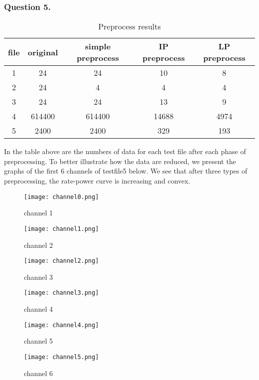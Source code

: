 \documentclass[11pt, oneside]{report}
\begin{document}
\subsubsection{Question 5.}

\begin{table}[!htbp]
\centering
\begin{tabular}{|c|c|c|c|c|}%
\hline
file & original & simple preprocess & IP preprocess & LP preprocess  \\
\hline
1 & 24 & 24 & 10 & 8\\
\hline
2 & 24 & 4 & 4 & 4\\
\hline
3 & 24 & 24 & 13 & 9\\
\hline
4 & 614400 & 614400 & 14688 & 4974\\
\hline
5 & 2400 & 2400 & 329 & 193\\
\hline
\end{tabular}
\caption{Preprocess results}
\end{table}

In the table above are the numbers of data for each test file after each phase of preprocessing. To better illustrate how the data are reduced, we present the graphs of the first 6 channels of testfile5 below. We see that after three types of preprocessing, the rate-power curve is increasing and convex.

\begin{figure}[htbp]
\centering
\begin{minipage}[t]{0.48\textwidth}
\centering
\texttt{[image: channel0.png]}
\caption{channel 1}
\end{minipage}
\begin{minipage}[t]{0.48\textwidth}
\centering
\texttt{[image: channel1.png]}
\caption{channel 2}
\end{minipage}
\centering
\begin{minipage}[t]{0.48\textwidth}
\centering
\texttt{[image: channel2.png]}
\caption{channel 3}
\end{minipage}
\begin{minipage}[t]{0.48\textwidth}
\centering
\texttt{[image: channel3.png]}
\caption{channel 4}
\end{minipage}
\centering
\begin{minipage}[t]{0.48\textwidth}
\centering
\texttt{[image: channel4.png]}
\caption{channel 5}
\end{minipage}
\begin{minipage}[t]{0.48\textwidth}
\centering
\texttt{[image: channel5.png]}
\caption{channel 6}
\end{minipage}
\end{figure}
\end{document}
